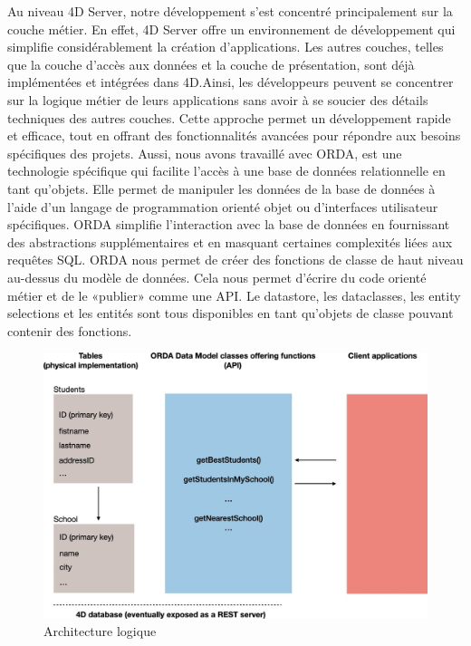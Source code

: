 Au niveau 4D Server, notre développement s’est concentré principalement sur la couche métier. En effet, 4D Server offre un environnement de développement qui simplifie considérablement la création d’applications. Les autres couches, telles que la couche d’accès aux données et la couche de présentation, sont déjà implémentées et intégrées dans 4D.Ainsi, les développeurs peuvent se concentrer sur la logique métier de leurs applications sans avoir à se soucier des détails techniques des autres couches. Cette approche permet un développement rapide et efficace, tout en offrant des fonctionnalités avancées pour répondre aux besoins spécifiques des projets.
\newline
Aussi, nous avons travaillé avec ORDA, est une technologie spécifique qui facilite l’accès à une base de données relationnelle en tant qu’objets. Elle permet de manipuler les données de la base de données à l’aide d’un langage de programmation orienté objet ou d’interfaces utilisateur spécifiques. ORDA simplifie l’interaction avec la base de données en fournissant des abstractions supplémentaires et en masquant certaines complexités liées aux requêtes SQL.
\newline
ORDA nous permet de créer des fonctions de classe de haut niveau au-dessus du modèle de données. Cela nous permet d’écrire du code orienté métier et de le «publier» comme une API. Le datastore, les
dataclasses, les entity selections et les entités sont tous disponibles en tant qu’objets de classe pouvant contenir des fonctions.

\begin{figure}[htbp]
   \centering
   \includegraphics[scale=0.3]{Images/logique 2.jpg} 
   \caption{Architecture logique}
   \label{fig:logiqueArch}
\end{figure}

